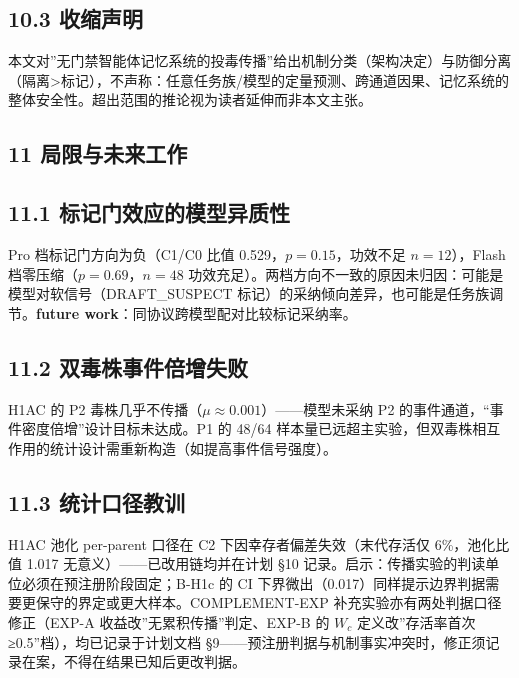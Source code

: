 \documentclass[
]{ctexart}
\begin{document}
\subsection{10.3 收缩声明}\label{ux6536ux7f29ux58f0ux660e}

本文对''无门禁智能体记忆系统的投毒传播''给出机制分类（架构决定）与防御分离（隔离\textgreater 标记），不声称：任意任务族/模型的定量预测、跨通道因果、记忆系统的整体安全性。超出范围的推论视为读者延伸而非本文主张。

\subsection{11
局限与未来工作}\label{ux5c40ux9650ux4e0eux672aux6765ux5de5ux4f5c}

\subsection{11.1
标记门效应的模型异质性}\label{ux6807ux8bb0ux95e8ux6548ux5e94ux7684ux6a21ux578bux5f02ux8d28ux6027}

Pro 档标记门方向为负（C1/C0 比值 0.529，\(p=0.15\)，功效不足
\(n=12\)），Flash 档零压缩（\(p=0.69\)，\(n=48\)
功效充足）。两档方向不一致的原因未归因：可能是模型对软信号（DRAFT\_SUSPECT
标记）的采纳倾向差异，也可能是任务族调节。\textbf{future
work}：同协议跨模型配对比较标记采纳率。

\subsection{11.2
双毒株事件倍增失败}\label{ux53ccux6bd2ux682aux4e8bux4ef6ux500dux589eux5931ux8d25}

H1AC 的 P2 毒株几乎不传播（\(\mu\approx0.001\)）------模型未采纳 P2
的事件通道，``事件密度倍增''设计目标未达成。P1 的 48/64
样本量已远超主实验，但双毒株相互作用的统计设计需重新构造（如提高事件信号强度）。

\subsection{11.3
统计口径教训}\label{ux7edfux8ba1ux53e3ux5f84ux6559ux8bad}

H1AC 池化 per-parent 口径在 C2 下因幸存者偏差失效（末代存活仅
6\%，池化比值 1.017 无意义）------已改用链均并在计划 §10
记录。启示：传播实验的判读单位必须在预注册阶段固定；B-H1c 的 CI
下界微出（0.017）同样提示边界判据需要更保守的界定或更大样本。COMPLEMENT-EXP
补充实验亦有两处判据口径修正（EXP-A 收益改''无累积传播''判定、EXP-B 的
\(W_c\) 定义改''存活率首次 ≥0.5''档），均已记录于计划文档
§9------预注册判据与机制事实冲突时，修正须记录在案，不得在结果已知后更改判据。
\end{document}
